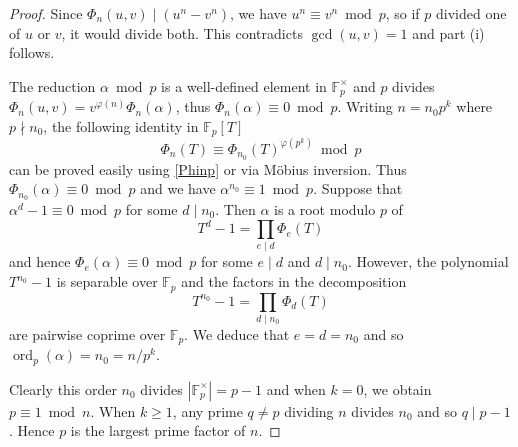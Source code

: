 \documentclass[12pt,reqno]{amsart}
\theoremstyle{remark}
\DeclareMathOperator{\ord}{ord}
\begin{document}
\begin{proof}
Since $\Phi_n(u,v)\mid \left(u^n-v^n\right)$, we have $u^n\equiv v^n\bmod p$, so if $p$ divided one of $u$ or $v$, it would divide both. This contradicts $\gcd(u,v)=1$ and part (i) follows.
\medskip

The reduction $\alpha\bmod p$ is a well-defined element in $\mathbb F_p^\times$ and $p$ divides $\Phi_n(u,v)=v^{\varphi(n)}\Phi_{n}(\alpha)$,  thus $\Phi_{n}(\alpha)\equiv 0\bmod p$. 
Writing $n=n_0p^k$ where $p\nmid n_0$, the following identity in $\mathbb{F}_p[T]$
\[\Phi_n(T)\equiv\Phi_{n_0}(T)^{\varphi(p^k)}\bmod p\]
can be proved easily using \eqref{Phinp} or via M\"{o}bius inversion. Thus $\Phi_{n_0}(\alpha)\equiv 0\bmod p$ and we have $\alpha^{n_0}\equiv 1\bmod p$. 
Suppose that $\alpha^d-1\equiv 0\bmod p$ for some $d\mid n_0$. Then $\alpha$ is a root modulo $p$ of 
\[T^{d}-1=\prod_{e\mid d}\Phi_e(T)\]
and hence $\Phi_e(\alpha)\equiv 0\bmod p$ for some $e\mid d$ and $d\mid n_0$. 
However, the polynomial $T^{n_0}-1$ is separable over $\mathbb{F}_p$ and the factors in the decomposition
\[T^{n_0}-1=\prod_{d\mid n_0}\Phi_d(T)\]
are pairwise coprime over $\mathbb{F}_p$. We deduce that $e=d=n_0$ and so $\ord_p(\alpha)=n_0=n/p^k$. 
\medskip

Clearly this order $n_0$ divides $\left|\mathbb{F}_p^\times\right|=p-1$ and when $k=0$, we obtain $p\equiv 1\bmod n$. 
When $k\geq 1$, any prime $q\neq p$ dividing $n$ divides $n_0$ and so $q\mid p-1$. Hence $p$ is the largest prime factor of $n$.
\end{proof}
\end{document}
